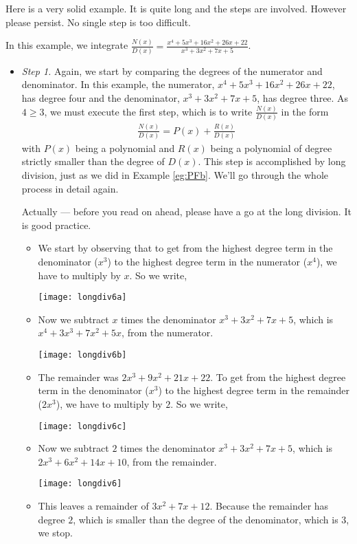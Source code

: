 Here is a very solid example. It is quite long and the steps are involved. However please
persist. No single step is too difficult.
\begin{eg}
                                                     \label{eg:PFc}

\noindent
In this example, we integrate $\frac{N(x)}{D(x)}=
\frac{x^4+5x^3+16x^2+26x+22}{x^3+3x^2+7x+5}$.

\soln
\begin{itemize}
 \item \emph{Step 1.}
Again, we start by comparing the degrees of the numerator and denominator.
In this example, the numerator, $x^4+5x^3+16x^2+26x+22$, has degree four
and the denominator, $x^3+3x^2+7x+5$, has degree  three. As $4\ge 3$, we
must execute the first step, which is to write $\frac{N(x)}{D(x)}$ in the
form
\begin{align*}
\frac{N(x)}{D(x)}=P(x)+\frac{R(x)}{D(x)}
\end{align*}
with $P(x)$ being a polynomial and $R(x)$ being a polynomial of degree
strictly smaller than the degree of $D(x)$. This step is accomplished by
long division, just as we did in Example \ref{eg:PFb}. We'll go through
the whole process in detail again.

Actually --- before you read on ahead, please have a go at the long division. It is
good practice.

\begin{itemize}
 \item We start by observing that to get from the highest degree term in the denominator
($x^3$) to the highest degree term in the numerator ($x^4$), we have to multiply by $x$.
So we write,
\begin{center}
\texttt{[image: longdiv6a]}
\end{center}
\item Now we subtract $x$ times the denominator $x^3+3x^2+7x+5$, which is
$x^4+3x^3+7x^2+5x$, from the numerator.
\begin{center}
\texttt{[image: longdiv6b]}
\end{center}
\item The remainder was $2x^3+9x^2+21x+22$. To get from the
highest degree term in the denominator ($x^3$) to the highest degree term
in the remainder ($2x^3$), we have to multiply by $2$. So we write,
\begin{center}
\texttt{[image: longdiv6c]}
\end{center}
\item Now we subtract $2$ times the denominator $x^3+3x^2+7x+5$, which is
$2x^3+6x^2+14x+10$, from the remainder.
\begin{center}
\texttt{[image: longdiv6]}
\end{center}
\item This leaves a remainder of $3x^2+7x+12$. Because the remainder
has degree $2$, which is smaller than the degree of the denominator, which
is $3$, we stop.


\end{itemize}
\end{itemize}
\end{eg}
